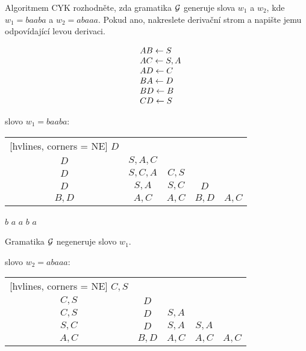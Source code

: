 Algoritmem CYK rozhodněte, zda gramatika $\mathcal{G}$ generuje slova $w_1$ a $w_2$, kde $w_1 = baaba$ a $w_2 = abaaa$.
 Pokud ano, nakreslete derivační strom a napište jemu odpovídající levou derivaci.


\begin{multicols}{2}
    

\[
    \begin{array}{l l}
    & AB \leftarrow S \\
    & AC \leftarrow S, A \\
    & AD \leftarrow C \\
    & BA \leftarrow D \\
    & BD \leftarrow B \\ 
    & CD \leftarrow S \\ 
    \end{array}
\]
    
slovo $w_1 = baaba$: 

\vspace*{2mm}

\begin{NiceTabular}{ccccc}[hvlines, corners = NE] %
    $D$ &  &   &   &   \\ 
    $D$ & $S, A, C$ &  &   &   \\ 
    $D$ & $S, C, A$ & $C, S$ &  &  \\ 
    $D$ & $S, A$ & $S, C$ & $D$ &  \\ 
    $B, D$ & $A,C$ & $A,C$ & $B, D$ & $A, C$ \\ 
\end{NiceTabular}

\hspace*{5mm}$b$ \hspace*{10mm} $a$ \hspace*{10mm} $a$ \hspace*{9mm} $b$ \hspace*{8mm} $a$
    
\vspace*{2mm}
    Gramatika $\mathcal{G}$ negeneruje slovo $w_1$. 

    slovo $w_2 = abaaa$: 
    
    \begin{NiceTabular}{ccccc}[hvlines, corners = NE] %
        $C,S$ &   &   &   &   \\ 
        $C, S$ & $D$ &   &   &   \\ 
        $C,S$ & $D$ & $S,A$ &   &   \\ 
        $S,C$ & $D$ & $S,A$ & $S,A$ &   \\ 
        $A,C$ & $B, D$ & $A,C$ & $A,C$ & $A,C$ \\ 
    \end{NiceTabular}
    

\end{multicols}
